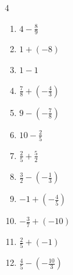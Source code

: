 \begin{multicols}{4}
\begin{enumerate}
  \item $\displaystyle 4 - \frac{8}{9}$


  \item $\displaystyle 1 + \left(-8\right)$

        \phantom{$\displaystyle =-7$}

  \item $\displaystyle 1 - 1$

        \phantom{$\displaystyle =0$}

  \item $\displaystyle \frac{7}{8} + \left(-\frac{4}{3}\right)$


  \item $\displaystyle 9 - \left(-\frac{7}{8}\right)$


  \item $\displaystyle 10 - \frac{2}{5}$


  \item $\displaystyle \frac{2}{5} + \frac{5}{2}$


  \item $\displaystyle \frac{3}{2} - \left(-\frac{1}{3}\right)$


\columnbreak %

  \item $\displaystyle -1 + \left(-\frac{4}{5}\right)$


  \item $\displaystyle -\frac{3}{7} + \left(-10\right)$


  \item $\displaystyle \frac{2}{5} + \left(-1\right)$


  \item $\displaystyle \frac{4}{5} - \left(-\frac{10}{3}\right)$


\end{enumerate}
\end{multicols}
